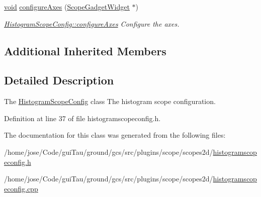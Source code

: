 \begin{DoxyCompactItemize}
\hyperlink{group___u_a_v_objects_plugin_ga444cf2ff3f0ecbe028adce838d373f5c}{void} \hyperlink{group___scope_plugin_ga522d6d5e834566550cacdb1eb24b934f}{configure\-Axes} (\hyperlink{class_scope_gadget_widget}{Scope\-Gadget\-Widget} $\ast$)
\begin{DoxyCompactList}\small\item\em \hyperlink{group___scope_plugin_ga522d6d5e834566550cacdb1eb24b934f}{Histogram\-Scope\-Config\-::configure\-Axes} Configure the axes. \end{DoxyCompactList}\end{DoxyCompactItemize}
\subsection*{Additional Inherited Members}


\subsection{Detailed Description}
The \hyperlink{class_histogram_scope_config}{Histogram\-Scope\-Config} class The histogram scope configuration. 

Definition at line 37 of file histogramscopeconfig.\-h.



The documentation for this class was generated from the following files\-:\begin{DoxyCompactItemize}
\item 
/home/jose/\-Code/gui\-Tau/ground/gcs/src/plugins/scope/scopes2d/\hyperlink{histogramscopeconfig_8h}{histogramscopeconfig.\-h}\item 
/home/jose/\-Code/gui\-Tau/ground/gcs/src/plugins/scope/scopes2d/\hyperlink{histogramscopeconfig_8cpp}{histogramscopeconfig.\-cpp}\end{DoxyCompactItemize}
